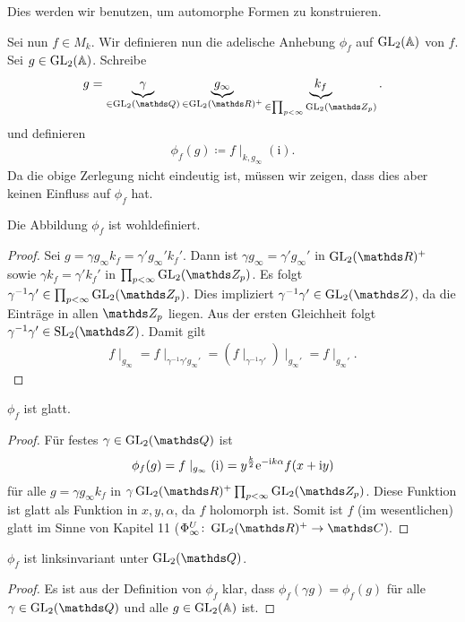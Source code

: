 Dies werden wir benutzen, um automorphe Formen zu konstruieren.

Sei nun $f \in M_k$. Wir definieren nun die adelische Anhebung $\phi_f$ auf $\operatorname{GL}_2(\mathbb{A})$ von $f$.
Sei $g \in \operatorname{GL}_2(\mathbb{A})$. Schreibe
\begin{align*}
g = \underbrace{\gamma}_{\in \GL_2(\Q)} \underbrace{g_\infty}_{ \in \GL_2(\R)^+} \underbrace{k_f}_{\in \prod_{p<\infty} \GL_2(\Z_p)}.
\end{align*}
und definieren
\begin{align*}
\phi_f(g)\coloneqq f\mid_{k,g_\infty}(\mathrm{i}).
\end{align*}
Da die obige Zerlegung nicht eindeutig ist, müssen wir zeigen, dass dies aber keinen Einfluss auf $\phi_f$ hat.
\begin{prop}
Die Abbildung $\phi_f$ ist wohldefiniert.
\end{prop}
\begin{proof}
Sei $g=\gamma g_\infty k_f=\gamma' g_\infty' k_f'$. Dann ist
$\gamma g_\infty=\gamma' g_\infty'$ in $\GL_2(\R)^+$ sowie
$\gamma k_f =\gamma' k_f'$ in $\prod_{p<\infty} \GL_2(\Z_p)$.
Es folgt $\gamma^{-1} \gamma' \in \prod_{p<\infty} \GL_2(\Z_p)$.
Dies impliziert $\gamma^{-1} \gamma' \in \GL_2(\Z)$, da die Einträge in allen $\Z_p$ liegen.
Aus der ersten Gleichheit folgt $\gamma^{-1} \gamma' \in \SL_2(\Z)$.
Damit gilt
\begin{align*}
f \mid_{g_\infty}=f \mid_{\gamma^{-1} \gamma' g_\infty'} = \left(f\mid_{\gamma^{-1} \gamma'} \right) \mid_{g_\infty'}=f\mid_{g_\infty'}.
\end{align*}
\end{proof}

\begin{prop}
$\phi_f$ ist glatt.
\end{prop}
\begin{proof}
Für festes $\gamma \in \GL_2(\Q)$ ist
\begin{align*}
\phi_f(g)=f\mid_{g_\infty}(\mathrm{i})=y^{\frac{k}{2}} \mathrm{e}^{-\mathrm{i}k\alpha } f(x+\mathrm{i}y)
\end{align*}
für alle $g=\gamma g_\infty k_f$ in $\gamma \GL_2(\R)^+ \prod_{p<\infty} \GL_2(\Z_p)$.
Diese Funktion ist glatt als Funktion in $x,y,\alpha$, da $f$ holomorph ist.
Somit ist $f$ (im wesentlichen) glatt im Sinne von Kapitel 11 ($\Phi_\infty^U \colon \GL_2(\R)^+ \to \C$).
\end{proof}

\begin{prop}
$\phi_f$ ist linksinvariant unter $\GL_2(\Q)$.
\end{prop}
\begin{proof}
Es ist aus der Definition von $\phi_f$ klar, dass $\phi_f(\gamma g)=\phi_f(g)$ für alle $\gamma \in \GL_2(\Q)$ und alle $g \in \operatorname{GL}_2(\mathbb{A})$ ist.
\end{proof}


